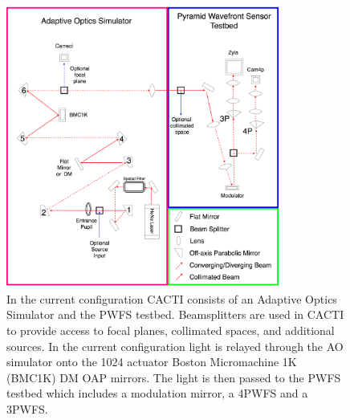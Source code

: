 \documentclass[12pt]{spieman}  %
\begin{document}
\begin{spacing}{2}
\begin{figure}
    \centering
    \includegraphics[width=0.8\textwidth]{CACTI.png}
    \caption{In the current configuration CACTI consists of an Adaptive Optics Simulator and the PWFS testbed. Beamsplitters are used in CACTI to provide access to focal planes, collimated spaces, and additional sources. In the current configuration light is relayed through the AO simulator onto the 1024 actuator Boston Micromachine 1K (BMC1K) DM OAP mirrors. The light is then passed to the PWFS testbed which includes a modulation mirror, a 4PWFS and a 3PWFS.}
    \label{fig:CACTI}
\end{figure}


\end{spacing}
\end{document}
